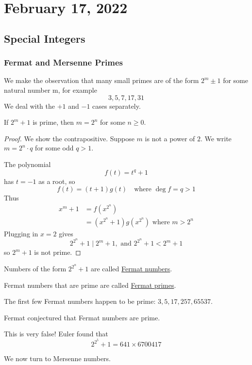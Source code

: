 \section{February 17, 2022}
\subsection{Special Integers}
\subsubsection{Fermat and Mersenne Primes}
We make the observation that many small primes are of the form $2^m\pm 1$ for some natural number m, for example
\[3, 5, 7, 17, 31\]
We deal with the $+1$ and $-1$ cases separately.
\begin{lemma}
	If $2^m + 1$ is prime, then $m = 2^n$ for some $n\geq 0$.
\end{lemma}
\begin{proof}
	We show the contrapositive. Suppose $m$ is not a power of $2$. We write $m=2^n\cdot q$ for some odd $q>1$.

	The polynomial
	\[f(t) = t^q + 1\]
	has $t=-1$ as a root, so
	\[f(t) = (t+1)g(t) \quad \text{where $\deg f = q > 1$}\]
	Thus
	\begin{align*}
		x^m+1 & = f(x^{2^n})                                   \\
		      & = (x^{2^n}+1)g(x^{2^n})\text{ where $m > 2^n$}
	\end{align*}
	Plugging in $x=2$ gives
	\[2^{2^n}+1\mid 2^m + 1, \text{ and }2^{2^n}+1 < 2^m+1\]
	so $2^m+1$ is not prime.
\end{proof}
\begin{definition}
	Numbers of the form $2^{2^n}+1$ are called \ul{Fermat numbers}.

	Fermat numbers that are prime are called \ul{Fermat primes}.
\end{definition}
The first few Fermat numbers happen to be prime: $3, 5, 17, 257, 65537$.

\begin{conjecture*}
	Fermat conjectured that Fermat numbers are prime.
\end{conjecture*}
This is very false! Euler found that
\[2^{2^5}+1 = 641\times 6700417\]

We now turn to Mersenne numbers.

